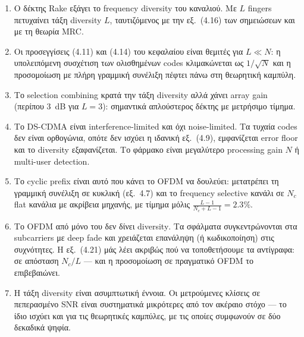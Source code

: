 \documentclass[11pt,a4paper]{article}
\newcommand{\en}[1]{\textenglish{#1}}
\newcommand{\dB}{\en{dB}}
\newcommand{\SNR}{\en{SNR}}
\newcommand{\MRC}{\en{MRC}}
\newcommand{\Rake}{\en{Rake}}
\begin{document}
\begin{enumerate}[leftmargin=2em]
  \item Ο δέκτης \Rake{} εξάγει το \en{frequency diversity} του καναλιού. Με $L$
        \en{fingers} πετυχαίνει τάξη \en{diversity} $L$, ταυτιζόμενος με την εξ.~(4.16) των
        σημειώσεων και με τη θεωρία \MRC{}.
  \item Οι προσεγγίσεις (4.11) και (4.14) του κεφαλαίου είναι θεμιτές για $L \ll N$: η
        υπολειπόμενη συσχέτιση των ολισθημένων \en{codes} κλιμακώνεται ως $1/\sqrt{N}$ και η
        προσομοίωση με πλήρη γραμμική συνέλιξη πέφτει πάνω στη θεωρητική καμπύλη.
  \item Το \en{selection combining} κρατά την τάξη \en{diversity} αλλά χάνει \en{array gain}
        (περίπου $3$~\dB{} για $L=3$): σημαντικά απλούστερος δέκτης με μετρήσιμο τίμημα.
  \item Το \en{DS-CDMA} είναι \en{interference-limited} και όχι \en{noise-limited}. Τα τυχαία
        \en{codes} δεν είναι ορθογώνια, οπότε δεν ισχύει η ιδανική εξ.~(4.9), εμφανίζεται
        \en{error floor} και το \en{diversity} εξαφανίζεται. Το φάρμακο είναι μεγαλύτερο
        \en{processing gain} $N$ ή \en{multi-user detection}.
  \item Το \en{cyclic prefix} είναι αυτό που κάνει το \en{OFDM} να δουλεύει: μετατρέπει τη
        γραμμική συνέλιξη σε κυκλική (εξ.~4.7) και το \en{frequency selective} κανάλι σε
        $N_c$ \en{flat} κανάλια με ακρίβεια μηχανής, με τίμημα μόλις
        $\frac{L-1}{N_c+L-1} = 2.3\%$.
  \item Το \en{OFDM} από μόνο του δεν δίνει \en{diversity}. Τα σφάλματα συγκεντρώνονται στα
        \en{subcarriers} με \en{deep fade} και χρειάζεται επανάληψη (ή κωδικοποίηση) στις
        συχνότητες. Η εξ.~(4.21) μάς λέει ακριβώς πού να τοποθετήσουμε τα αντίγραφα: σε
        απόσταση $N_c/L$ — και η προσομοίωση σε πραγματικό \en{OFDM} το επιβεβαιώνει.
  \item Η τάξη \en{diversity} είναι ασυμπτωτική έννοια. Οι μετρούμενες κλίσεις σε πεπερασμένο
        \SNR{} είναι συστηματικά μικρότερες από τον ακέραιο στόχο — το ίδιο ισχύει και για
        τις θεωρητικές καμπύλες, με τις οποίες συμφωνούν σε δύο δεκαδικά ψηφία.
\end{enumerate}
\end{document}
